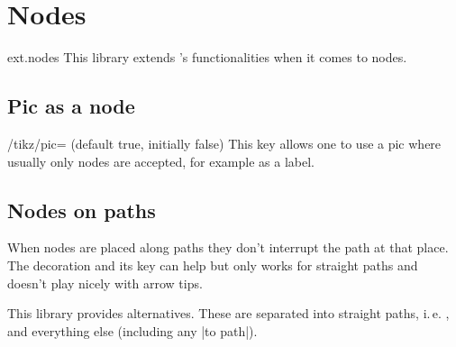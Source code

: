 %
%
%

\section{Nodes}
\begin{tikzlibrary}{ext.nodes}
This library extends \tikzname's functionalities when it comes to nodes.
\end{tikzlibrary}

\begin{multicols}{2}

\subsection{Pic as a node}
\begin{key}{/tikz/pic= (default true, initially false)}
This key allows one to use a pic where usually only nodes are accepted,
for example as a label.
\begin{codeexample}[preamble=\usetikzlibrary{ext.nodes, ext.misc}]
\begin{tikzpicture}[
  slsl/.pic={\draw(-2pt, 1.5pt)--( 2pt, .5pt)
                  ( 2pt,-1.5pt)--(-2pt,-.5pt);}]
\node[
  draw, minimum width=3cm, minimum height=1cm,
  label={[pic            ] east:slsl},
  label={[pic, rotate= 90]north:slsl},
  label={[pic            ] west:slsl},
  label={[pic, rotate=-90]south:slsl}]{};
\end{tikzpicture}
\end{codeexample}
\end{key}

\subsection{Nodes on paths}
When nodes are placed along paths they don't interrupt
the path at that place.
The decoration 
and its 
key can help but only works for straight paths and
doesn't play nicely with arrow tips.

This library provides alternatives.
These are separated into straight paths, i.\,e. ,
and everything else (including any |to path|).


\end{multicols}

